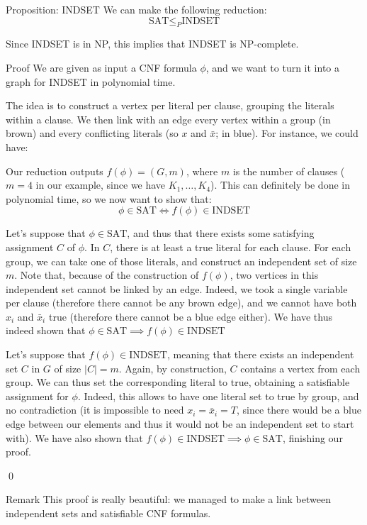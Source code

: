 \documentclass[a4paper]{article}
\begin{document}
\begin{parag}{Proposition: INDSET}
    We can make the following reduction: 
    \[\text{SAT} \leq_P \text{INDSET}\]
    
    Since INDSET is in NP, this implies that INDSET is NP-complete.

    \begin{subparag}{Proof}
        We are given as input a CNF formula $\phi$, and we want to turn it into a graph for INDSET in polynomial time.

        The idea is to construct a vertex per literal per clause, grouping the literals within a clause. We then link with an edge every vertex within a group (in brown) and every conflicting literals (so $x$ and $\bar{x}$; in blue). For instance, we could have:

        Our reduction outputs $f\left(\phi\right) = \left(G, m\right)$, where $m$ is the number of clauses ($m = 4$ in our example, since we have $K_1, \ldots, K_4$). This can definitely be done in polynomial time, so we now want to show that:
        \[\phi \in \text{SAT} \iff f\left(\phi\right) \in \text{INDSET}\]

        Let's suppose that $\phi \in \text{SAT}$, and thus that there exists some satisfying assignment $C$ of $\phi$. In $C$, there is at least a true literal for each clause. For each group, we can take one of those literals, and construct an independent set of size $m$. Note that, because of the construction of $f\left(\phi\right)$, two vertices in this independent set cannot be linked by an edge. Indeed, we took a single variable per clause (therefore there cannot be any brown edge), and we cannot have both $x_i$ and $\bar{x}_i$ true (therefore there cannot be a blue edge either). We have thus indeed shown that $\phi \in \text{SAT} \implies f\left(\phi\right) \in \text{INDSET}$

        Let's suppose that $f\left(\phi\right) \in \text{INDSET}$, meaning that there exists an independent set $C$ in $G$ of size $\left|C\right| = m$. Again, by construction, $C$ contains a vertex from each group. We can thus set the corresponding literal to true, obtaining a satisfiable assignment for $\phi$. Indeed, this allows to have one literal set to true by group, and no contradiction (it is impossible to need $x_i = \bar{x}_i = T$, since there would be a blue edge between our elements and thus it would not be an independent set to start with). We have also shown that $f\left(\phi\right) \in \text{INDSET} \implies \phi \in \text{SAT}$, finishing our proof.

        \qed
    \end{subparag}
    
    \begin{subparag}{Remark}
        This proof is really beautiful: we managed to make a link between independent sets and satisfiable CNF formulas.
    \end{subparag}
\end{parag}
\end{document}
